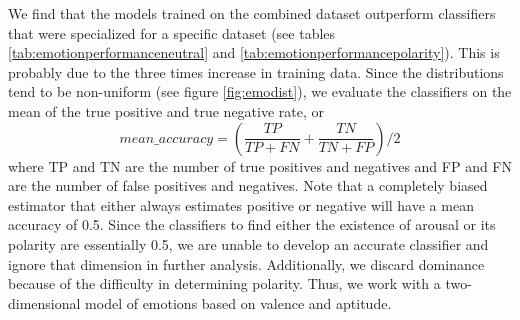 We find that the models trained on the combined dataset outperform classifiers that were specialized for a specific dataset (see tables \ref{tab:emotionperformanceneutral} and \ref{tab:emotionperformancepolarity}). This is probably due to the three times increase in training data. Since the distributions tend to be non-uniform (see figure \ref{fig:emodist}), we evaluate the classifiers on the mean of the true positive and true negative rate, or 
\begin{equation}
mean\_accuracy = (\frac{TP}{TP+FN}+\frac{TN}{TN+FP})/2
\end{equation} 
where TP and TN are the number of true positives and negatives and FP and FN are the number of false positives and negatives. Note that a completely biased estimator that either always estimates positive or negative will have a mean accuracy of 0.5. Since the classifiers to find either the existence of arousal or its polarity are essentially 0.5, we are unable to develop an accurate classifier and ignore that dimension in further analysis. Additionally, we discard dominance because of the difficulty in determining polarity. Thus, we work with a two-dimensional model of emotions based on valence and aptitude. 

